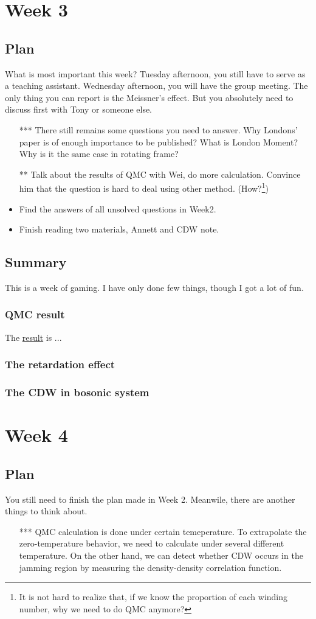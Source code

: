 \documentclass[10pt,a4paper,openany]{book}
\newcommand{\abpath}{D:/大四/科研日志/website/}
\begin{document}
\chapter{Week 3}
\section{Plan}
What is most important this week? Tuesday afternoon, you still have to serve as a teaching assistant. Wednesday afternoon, you will have the group meeting. The only thing you can report is the Meissner's effect. But you absolutely need to discuss first with Tony or someone else.
\begin{itemize}
	\item[***] There still remains some questions you need to answer. Why Londons' paper is of enough importance to be published? What is London Moment? Why is it the same case in rotating frame?
	\item[**] Talk about the results of QMC with Wei, do more calculation. Convince him that the question is hard to deal using other method. (How?\footnote{It is not hard to realize that, if we know the proportion of each winding number, why we need to do QMC anymore? })
	\item Find the answers of all unsolved questions in Week2.
	\item Finish reading two materials, Annett and CDW note.
\end{itemize}
\section{Summary}
This is a week of gaming. I have only done few things, though I got a lot of fun.
\subsection{QMC result}
The \href{\abpath notes/parallel_tempring.pdf}{result} is ...
\subsection{The retardation effect}
\subsection{The CDW in bosonic system}

\chapter{Week 4}
\section{Plan}
You still need to finish the plan made in Week 2. Meanwile, there are another things to think about.
\begin{itemize}
	\item[***] QMC calculation is done under certain temeperature. To extrapolate the zero-temperature behavior, we need to calculate under several different temperature. On the other hand, we can detect whether CDW occurs in the jamming region by measuring the density-density correlation function.
\end{itemize}
\end{document}
